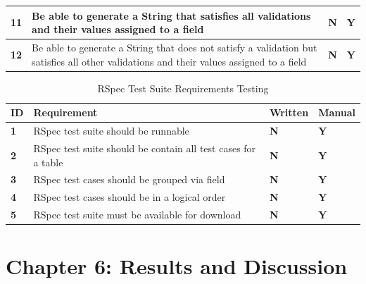 \documentclass[a4paper,12pt]{article}
\begin{document}
\begin{table}
\begin{tabularx}{\textwidth}{|l|X|l|l|}
\textbf{11} & Be able to generate a String that satisfies all validations and their values assigned to a field                                            & \textbf{N}   & \textbf{Y}       \\ \hline
\textbf{12} & Be able to generate a String that does not satisfy a validation but satisfies all other validations and their values assigned to a field    & \textbf{N}   & \textbf{Y}      \\ \hline
\end{tabularx}
\end{table}

\begin{table}
\centering
\caption{RSpec Test Suite Requirements Testing}
\label{met:3}
\begin{tabularx}{\textwidth}{|l|X|l|l|}
\hline
\textbf{ID} & \textbf{Requirement}                                          & \textbf{Written} & \textbf{Manual} \\ \hline
\textbf{1}  & RSpec test suite should be runnable                          & \textbf{N}   & \textbf{Y}       \\ \hline
\textbf{2}  & RSpec test suite should be contain all test cases for a table  & \textbf{N}   & \textbf{Y}      \\ \hline
\textbf{3}  & RSpec test cases should be grouped via field                 & \textbf{N}   & \textbf{Y}      \\ \hline
\textbf{4}  & RSpec test cases should be in a logical order                 & \textbf{N}   & \textbf{Y}      \\ \hline
\textbf{5}  & RSpec test suite must be available for download               & \textbf{N}   & \textbf{Y}     \\ \hline
\end{tabularx}
\end{table}










\section{Chapter 6: Results and Discussion}
\end{document}
